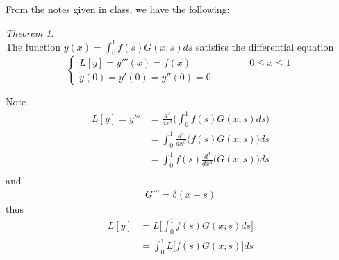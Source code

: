 \documentclass[12pt]{article}
\newcommand{\R}{\mathbb{R}}
\newenvironment{subproblem}[2][Part]{\begin{trivlist}
  \item[\hskip \labelsep {\bfseries #1}\hskip \labelsep {\bfseries (#2)}]}{\end{trivlist}}
\newenvironment{solution}[1][Solution]{\begin{trivlist}
  \item[\hskip \labelsep {\bfseries #1} \hskip \labelsep]}{\end{trivlist}}
\theoremstyle{remark}
\newtheorem*{theorem*}{Theorem}
\begin{document}
\begin{solution}
  $ $\\
  From the notes given in class, we have the following:
  \begin{theorem*}{}
    $ $\\
    The function \(y(x) = \int_{0}^{1}f(s)G(x;s)ds\)
    satisfies the differential equation
    \[
      \left\{
        \begin{array}{ll}
          L[y] = y'''(x) = f(x) \qquad\qquad\qquad 0 \le x \le 1 \\
          y(0) = y'(0) = y''(0) = 0
        \end{array}
      \right.
    \]
  \end{theorem*}
  $ $\\
  Note
  \begin{align*}
    L[y] = y''' &= \frac{d^3}{dx^3}\big(\int_{0}^{1}f(s)G(x;s)ds\big) \\
                &= \int_{0}^{1}\frac{d^3}{dx^3}\big(f(s)G(x;s)\big)ds \\
                &= \int_{0}^{1}f(s)\frac{d^3}{dx^3}\big(G(x;s)\big)ds \\    
  \end{align*}
  and
  \begin{align*}
    G''' = \delta(x-s) 
  \end{align*}
  thus
  \begin{align*}
    L[y] &= L\bigg[\int_{0}^{1}f(s)G(x;s)ds \bigg] \\
         &= \int_{0}^{1}L\bigg[f(s)G(x;s)\bigg] ds
  \end{align*}
\end{solution}


\end{document}
